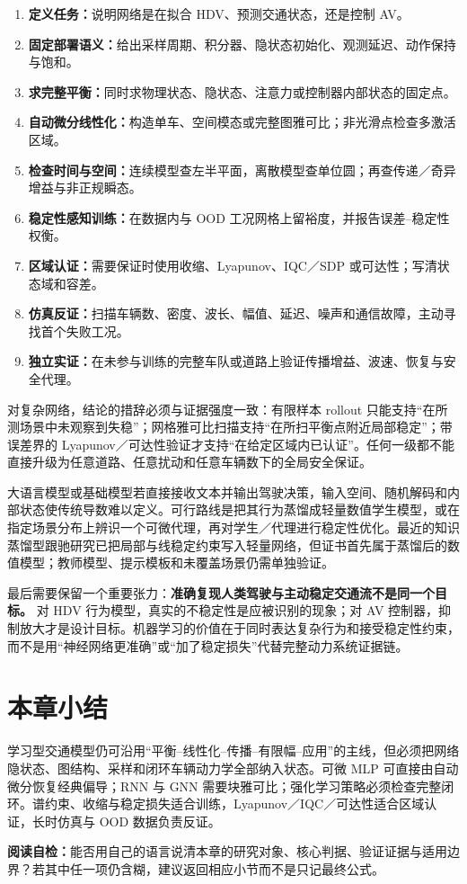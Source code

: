 \documentclass[11pt,a4paper,openany]{book}
\numberwithin{equation}{chapter}
\numberwithin{figure}{chapter}
\numberwithin{table}{chapter}
\newcommand{\sectionwrapup}[1]{%
  \section{本章小结}
  \begin{tcolorbox}[summarybox,title=\textbf{章末回顾}]
  #1
  \par\smallskip
  \textbf{阅读自检：}能否用自己的语言说清本章的研究对象、核心判据、验证证据与适用边界？若其中任一项仍含糊，建议返回相应小节而不是只记最终公式。
  \end{tcolorbox}
  \clearpage
}
\begin{document}
\begin{tcolorbox}[keybox,title=\textbf{从学习模型到稳定性结论的九步流程}]
\begin{enumerate}[leftmargin=1.6em,itemsep=3pt]
\item \textbf{定义任务：}说明网络是在拟合 HDV、预测交通状态，还是控制 AV。
\item \textbf{固定部署语义：}给出采样周期、积分器、隐状态初始化、观测延迟、动作保持与饱和。
\item \textbf{求完整平衡：}同时求物理状态、隐状态、注意力或控制器内部状态的固定点。
\item \textbf{自动微分线性化：}构造单车、空间模态或完整图雅可比；非光滑点检查多激活区域。
\item \textbf{检查时间与空间：}连续模型查左半平面，离散模型查单位圆；再查传递／奇异增益与非正规瞬态。
\item \textbf{稳定性感知训练：}在数据内与 OOD 工况网格上留裕度，并报告误差--稳定性权衡。
\item \textbf{区域认证：}需要保证时使用收缩、Lyapunov、IQC／SDP 或可达性；写清状态域和容差。
\item \textbf{仿真反证：}扫描车辆数、密度、波长、幅值、延迟、噪声和通信故障，主动寻找首个失败工况。
\item \textbf{独立实证：}在未参与训练的完整车队或道路上验证传播增益、波速、恢复与安全代理。
\end{enumerate}
\end{tcolorbox}

对复杂网络，结论的措辞必须与证据强度一致：有限样本 rollout 只能支持“在所测场景中未观察到失稳”；网格雅可比扫描支持“在所扫平衡点附近局部稳定”；带误差界的 Lyapunov／可达性验证才支持“在给定区域内已认证”。任何一级都不能直接升级为任意道路、任意扰动和任意车辆数下的全局安全保证。

大语言模型或基础模型若直接接收文本并输出驾驶决策，输入空间、随机解码和内部状态使传统导数难以定义。可行路线是把其行为蒸馏成轻量数值学生模型，或在指定场景分布上辨识一个可微代理，再对学生／代理进行稳定性优化。最近的知识蒸馏型跟驰研究已把局部与线稳定约束写入轻量网络，但证书首先属于蒸馏后的数值模型；教师模型、提示模板和未覆盖场景仍需单独验证。

最后需要保留一个重要张力：\textbf{准确复现人类驾驶与主动稳定交通流不是同一个目标。} 对 HDV 行为模型，真实的不稳定性是应被识别的现象；对 AV 控制器，抑制放大才是设计目标。机器学习的价值在于同时表达复杂行为和接受稳定性约束，而不是用“神经网络更准确”或“加了稳定损失”代替完整动力系统证据链。

\sectionwrapup{学习型交通模型仍可沿用“平衡--线性化--传播--有限幅--应用”的主线，但必须把网络隐状态、图结构、采样和闭环车辆动力学全部纳入状态。可微 MLP 可直接由自动微分恢复经典偏导；RNN 与 GNN 需要块雅可比；强化学习策略必须检查完整闭环。谱约束、收缩与稳定损失适合训练，Lyapunov／IQC／可达性适合区域认证，长时仿真与 OOD 数据负责反证。}
\end{document}

